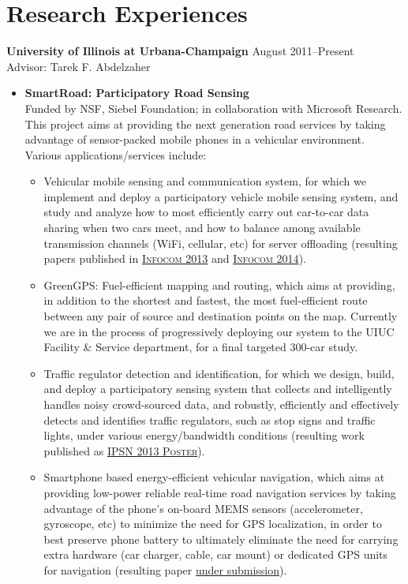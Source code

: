 \section{\sc Research Experiences} {\bf University of Illinois at Urbana-Champaign} \hfill August 2011--Present\\
Advisor: Tarek F. Abdelzaher 
\begin{itemize}
	\item \textbf{SmartRoad: Participatory Road Sensing} \\
	Funded by NSF, Siebel Foundation; in collaboration with Microsoft Research. This project aims at providing the next generation road services by taking advantage of sensor-packed mobile phones in a vehicular environment. Various applications/services include: 
	\begin{itemize}
		\item Vehicular mobile sensing and communication system, for which we implement and deploy a participatory vehicle mobile sensing system, and study and analyze how to most efficiently carry out car-to-car data sharing when two cars meet, and how to balance among available transmission channels (WiFi, cellular, etc) for server offloading (resulting papers published in \hyperlink{liu2013infocom}{\textsc{Infocom 2013}} and \hyperlink{hu2014infocom}{\textsc{Infocom 2014}}).
		
		\item GreenGPS: Fuel-efficient mapping and routing, which aims at providing, in addition to the shortest and fastest, the most fuel-efficient route between any pair of source and destination points on the map. Currently we are in the process of progressively deploying our system to the UIUC Facility \& Service department, for a final targeted 300-car study.
		
		\item Traffic regulator detection and identification, for which we design, build, and deploy a participatory sensing system that collects and intelligently handles noisy crowd-sourced data, and robustly, efficiently and effectively detects and identifies traffic regulators, such as stop signs and traffic lights, under various energy/bandwidth conditions (resulting work published as \hyperlink{hu2013ipsn}{\textsc{IPSN 2013 Poster}}).
		
		\item Smartphone based energy-efficient vehicular navigation, which aims at providing low-power reliable real-time road navigation services by taking advantage of the phone's on-board MEMS sensors (accelerometer, gyroscope, etc) to minimize the need for GPS localization, in order to best preserve phone battery to ultimately eliminate the need for carrying extra hardware (car charger, cable, car mount) or dedicated GPS units for navigation (resulting paper \hyperlink{hu2014mobisys}{under submission}).
	\end{itemize}
	

\end{itemize}
